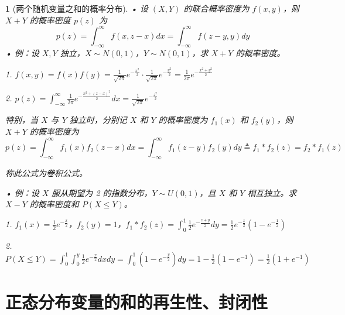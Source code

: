 \documentclass[UTF8]{report}
\theoremstyle{MyLineTheoremStyle} %
\theoremstyle{MyBlockTheoremStyle} %
\theoremstyle{MySubsubsectionStyle} %
\newtheorem{definition}{}
\begin{document}
\begin{definition}[两个随机变量之和的概率分布]
    • 设 $(X,Y)$ 的联合概率密度为 $f(x,y)$，则 $X+Y$ 的概率密度 $p(z)$ 为
    \[
    p(z) = \int_{-\infty}^{\infty} f(x,z-x)dx = \int_{-\infty}^{\infty} f(z-y,y)dy
    \]
    • 例：设 $X, Y$ 独立，$X \sim N(0,1)$，$Y \sim N(0,1)$，求 $X+Y$ 的概率密度。\par
    1. $f(x,y) = f(x)f(y) = \frac{1}{\sqrt{2\pi}}e^{-\frac{x^2}{2}} \cdot \frac{1}{\sqrt{2\pi}}e^{-\frac{y^2}{2}} = \frac{1}{2\pi}e^{-\frac{x^2+y^2}{2}}$\par
    2. $p(z) = \int_{-\infty}^{\infty} \frac{1}{2\pi}e^{-\frac{x^2+(z-x)^2}{2}}dx = \frac{1}{\sqrt{2\pi}}e^{-\frac{z^2}{2}}$\par
    特别，当 $X$ 与 $Y$ 独立时，分别记 $X$ 和 $Y$ 的概率密度为 $f_1(x)$ 和 $f_2(y)$，则 $X+Y$ 的概率密度为
    \[
    p(z) = \int_{-\infty}^{\infty} f_1(x)f_2(z-x)dx = \int_{-\infty}^{\infty} f_1(z-y)f_2(y)dy \triangleq  f_1 * f_2(z) = f_2 * f_1(z)
    \]\par
    称此公式为卷积公式。\par
    • 例：设 $X$ 服从期望为 2 的指数分布，$Y \sim U(0,1)$，且 $X$ 和 $Y$ 相互独立。求 $X-Y$ 的概率密度和 $P(X \leq Y)$。\par
    1. $f_1(x) = \frac{1}{2}e^{-\frac{x}{2}}$，$f_2(y) = 1$，$f_1 * f_2(z) = \int_{0}^{1} \frac{1}{2}e^{-\frac{z+y}{2}}dy = \frac{1}{2}e^{-\frac{z}{2}}(1 - e^{-\frac{1}{2}})$\par
    2. $P(X \leq Y) = \int_{0}^{1} \int_{0}^{y} \frac{1}{2}e^{-\frac{x}{2}}dxdy = \int_{0}^{1} (1-e^{-\frac{y}{2}})dy = 1 - \frac{1}{2}(1 - e^{-1}) = \frac{1}{2}(1 + e^{-1})$
\end{definition}

\section{正态分布变量的和的再生性、封闭性}
\end{document}
